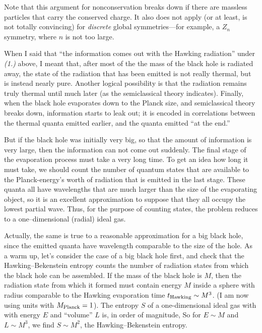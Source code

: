 Note that this argument for nonconservation breaks down if there are massless
particles that
carry the conserved charge. It also
does not apply (or at least, is not totally convincing) for
{\it discrete} global symmetries---for example, a $Z_n$
symmetry, where $n$ is not too large.

\bigskip
{}
When I said that ``the information comes out with the Hawking radiation'' under
{\it (1.)} above, I meant that, after most of the the mass of the black hole is
radiated away, the state of the radiation that has been emitted is not really
thermal, but is instead nearly pure.  Another logical possibility is that the
radiation remains truly thermal until much later (as the semiclassical theory
indicates).  Finally, when the black hole  evaporates down to the Planck size,
and semiclassical theory breaks down, information starts to leak out;
it is encoded in correlations between the thermal  quanta emitted earlier, and
the quanta emitted ``at the end.''

But if the black hole was initially very big, so that the amount of information
is very large, then the information can not come out suddenly.  The final stage
of the
evaporation process must take a very long time\lref{}\lref{}.
To get an idea how long it must take, we should count the number of
quantum states that are available to the Planck-energy's worth of radiation
that is emitted in the last stage.  These quanta all have wavelengths
that are much larger than the size of the evaporating object, so it is an
excellent approximation to suppose that they
all occupy the lowest partial wave.  Thus, for the purpose of counting
states, the problem reduces to a one--dimensional (radial) ideal gas.

Actually, the same is true to a
reasonable approximation for a big black hole, since the emitted quanta
have wavelength comparable to the size of the hole.  As a warm up, let's
consider the case of a big black hole first, and check that the
Hawking--Bekenstein entropy counts the number of radiation states from
which the black hole can be assembled.  If the mass of the black hole is
$M$, then the radiation state from which it formed must contain energy
$M$ inside a sphere with radius
comparable to the Hawking evaporation time
$t_{\rm Hawking}\sim M^3$.  (I am now using units with $M_{\rm Planck}=1$).
The
entropy $S$ of a one-dimensional ideal gas  with with energy $E$ and
``volume'' $L$ is, in order of magnitude,
\eqn{}
%
So for $E\sim M$ and $L\sim M^3$, we find $S\sim M^2$, the Hawking--Bekenstein
entropy.

